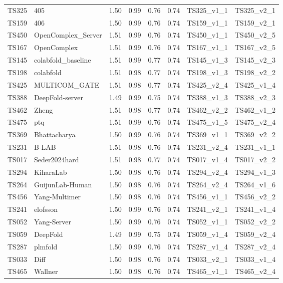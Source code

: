 \begin{longtable}{llllllll}
TS325 & 405 & 1.50 & 0.99 & 0.76 & 0.74 & TS325\_v1\_1 & TS325\_v2\_1 \\ 
TS159 & 406 & 1.50 & 0.99 & 0.76 & 0.74 & TS159\_v1\_1 & TS159\_v2\_1 \\ 
TS450 & OpenComplex\_Server & 1.51 & 0.99 & 0.76 & 0.74 & TS450\_v1\_1 & TS450\_v2\_5 \\ 
TS167 & OpenComplex & 1.51 & 0.99 & 0.76 & 0.74 & TS167\_v1\_1 & TS167\_v2\_5 \\ 
TS145 & colabfold\_baseline & 1.51 & 0.99 & 0.77 & 0.74 & TS145\_v1\_3 & TS145\_v2\_3 \\ 
TS198 & colabfold & 1.51 & 0.98 & 0.77 & 0.74 & TS198\_v1\_3 & TS198\_v2\_2 \\ 
TS425 & MULTICOM\_GATE & 1.51 & 0.98 & 0.77 & 0.74 & TS425\_v2\_4 & TS425\_v1\_4 \\ 
TS388 & DeepFold-server & 1.49 & 0.99 & 0.75 & 0.74 & TS388\_v1\_3 & TS388\_v2\_3 \\ 
TS462 & Zheng & 1.51 & 0.98 & 0.77 & 0.74 & TS462\_v2\_2 & TS462\_v1\_2 \\ 
TS475 & ptq & 1.51 & 0.99 & 0.76 & 0.74 & TS475\_v1\_5 & TS475\_v2\_4 \\ 
TS369 & Bhattacharya & 1.50 & 0.99 & 0.76 & 0.74 & TS369\_v1\_1 & TS369\_v2\_2 \\ 
TS231 & B-LAB & 1.51 & 0.98 & 0.76 & 0.74 & TS231\_v2\_4 & TS231\_v1\_1 \\ 
TS017 & Seder2024hard & 1.51 & 0.98 & 0.77 & 0.74 & TS017\_v1\_4 & TS017\_v2\_2 \\ 
TS294 & KiharaLab & 1.50 & 0.98 & 0.76 & 0.74 & TS294\_v2\_4 & TS294\_v1\_3 \\ 
TS264 & GuijunLab-Human & 1.50 & 0.98 & 0.76 & 0.74 & TS264\_v2\_4 & TS264\_v1\_6 \\ 
TS456 & Yang-Multimer & 1.50 & 0.98 & 0.76 & 0.74 & TS456\_v1\_1 & TS456\_v2\_2 \\ 
TS241 & elofsson & 1.50 & 0.99 & 0.76 & 0.74 & TS241\_v2\_1 & TS241\_v1\_4 \\ 
TS052 & Yang-Server & 1.50 & 0.99 & 0.76 & 0.74 & TS052\_v1\_1 & TS052\_v2\_2 \\ 
TS059 & DeepFold & 1.49 & 0.99 & 0.75 & 0.74 & TS059\_v1\_4 & TS059\_v2\_4 \\ 
TS287 & plmfold & 1.50 & 0.99 & 0.76 & 0.74 & TS287\_v1\_4 & TS287\_v2\_4 \\ 
TS033 & Diff & 1.50 & 0.98 & 0.76 & 0.74 & TS033\_v2\_1 & TS033\_v1\_4 \\ 
TS465 & Wallner & 1.50 & 0.98 & 0.76 & 0.74 & TS465\_v1\_1 & TS465\_v2\_4 \\ 

\end{longtable}
